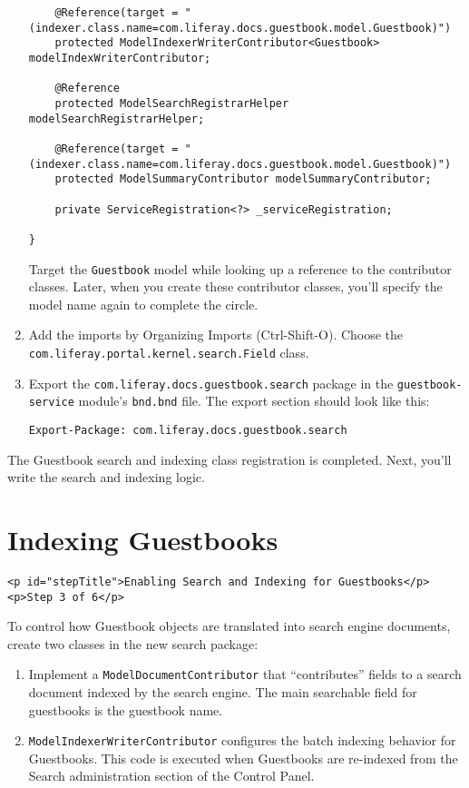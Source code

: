 \begin{enumerate}
\begin{verbatim}
    @Reference(target = "(indexer.class.name=com.liferay.docs.guestbook.model.Guestbook)")
    protected ModelIndexerWriterContributor<Guestbook> modelIndexWriterContributor;

    @Reference
    protected ModelSearchRegistrarHelper modelSearchRegistrarHelper;

    @Reference(target = "(indexer.class.name=com.liferay.docs.guestbook.model.Guestbook)")
    protected ModelSummaryContributor modelSummaryContributor;

    private ServiceRegistration<?> _serviceRegistration;

}
\end{verbatim}

  Target the \texttt{Guestbook} model while looking up a reference to
  the contributor classes. Later, when you create these contributor
  classes, you'll specify the model name again to complete the circle.
\item
  Add the imports by Organizing Imports (Ctrl-Shift-O). Choose the
  \texttt{com.liferay.portal.kernel.search.Field} class.
\item
  Export the \texttt{com.liferay.docs.guestbook.search} package in the
  \texttt{guestbook-service} module's \texttt{bnd.bnd} file. The export
  section should look like this:

\begin{verbatim}
Export-Package: com.liferay.docs.guestbook.search
\end{verbatim}
\end{enumerate}

The Guestbook search and indexing class registration is completed. Next,
you'll write the search and indexing logic.

\chapter{Indexing Guestbooks}\label{indexing-guestbooks}

\begin{verbatim}
<p id="stepTitle">Enabling Search and Indexing for Guestbooks</p><p>Step 3 of 6</p>
\end{verbatim}

To control how Guestbook objects are translated into search engine
documents, create two classes in the new search package:

\begin{enumerate}
\def\labelenumi{\arabic{enumi}.}
\item
  Implement a \texttt{ModelDocumentContributor} that ``contributes''
  fields to a search document indexed by the search engine. The main
  searchable field for guestbooks is the guestbook name.
\item
  \texttt{ModelIndexerWriterContributor} configures the batch indexing
  behavior for Guestbooks. This code is executed when Guestbooks are
  re-indexed from the Search administration section of the Control
  Panel.
\end{enumerate}


